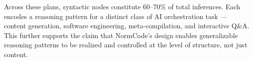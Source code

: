 Across these plans, syntactic nodes constitute 60--70\% of total inferences. Each
encodes a reasoning pattern for a distinct class of AI orchestration task --- content
generation, software engineering, meta-compilation, and interactive Q\&A. This further 
supports the claim that NormCode's design enables generalizable reasoning patterns to be
realized and controlled at the level of structure, not just content.
